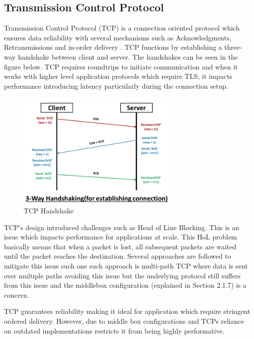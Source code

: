 \subsection{Transmission Control Protocol}


Transmission Control Protocol (TCP) is a connection oriented protocol which ensures data reliability with several mechanisms such as Acknowledgments, Retransmissions and in-order delivery \cite{kurose2017}. TCP functions by establishing a three-way handshake between client and server. The handshakes can be seen in the figure below. TCP requires roundtrips to initiate communication and when it works with higher level application protocols which require TLS, it impacts performance introducing latency particularly during the connection setup.


\begin{figure}[H]
\caption{TCP Handshake}
\centering
\includegraphics[width=0.7\textwidth]{SOA/tcp.png}
\end{figure}


TCP's design introduced challenges such as Head of Line Blocking. This is an issue which impacts performance for applications at scale. This HoL problem basically means that when a packet is lost, all subsequent packets are waited until the packet reaches the destination. Several approaches are followed to mitigate this issue such one such approach is multi-path TCP where data is sent over multiple paths avoiding this issue but the underlying protocol still suffers from this issue and the middlebox configuration (explained in Section 2.1.7) is a concern.

TCP guarantees reliability making it ideal for application which require stringent ordered delivery. However, due to middle box configurations and TCPs reliance on outdated implementations restricts it from being highly performative.


